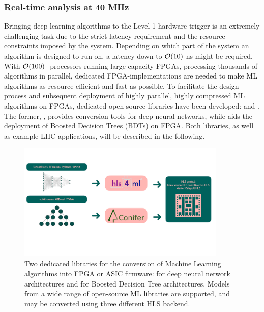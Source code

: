 \subsubsection{Real-time analysis at 40 MHz}
Bringing deep learning algorithms to the Level-1 hardware trigger is an extremely challenging task due to the strict latency requirement and the resource constraints imposed by the system. Depending on which part of the system an algorithm is designed to run on, a latency down to ${\cal O}(10)~$ns might be required.  With ${\cal O}(100)~$ processors running large-capacity FPGAs, processing thousands of algorithms in parallel, dedicated FPGA-implementations are needed to make ML algorithms as resource-efficient and fast as possible.
To facilitate the design process and subsequent deployment of highly parallel, highly compressed ML algorithms on FPGAs, dedicated open-source libraries have been developed: \hlsfml and \conifer. The former, \hlsfml, provides conversion tools for deep neural networks, while \conifer aids the deployment of Boosted Decision Trees (BDTs) on FPGA. Both libraries, as well as example LHC applications, will be described in the following.
\begin{figure}[htb]
    \centering
    \includegraphics[width=0.89\textwidth]{figures/hls4ml_conifer.pdf}
    \caption{Two dedicated libraries for the conversion of Machine Learning algorithms into FPGA or ASIC firmware: \hlsfml for deep neural network architectures and \conifer for Boosted Decision Tree architectures. Models from a wide range of open-source ML libraries are supported, and may be converted using three different HLS backend.}
    \label{figs2:libraries}
\end{figure}

